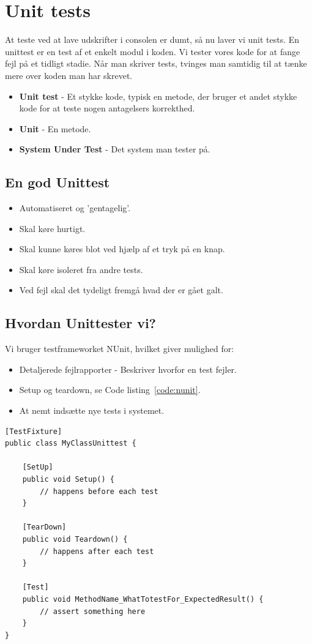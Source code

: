 \section{Unit tests}
At teste ved at lave udskrifter i consolen er dumt, så nu laver vi unit tests. En unittest er en test af et enkelt modul i koden. Vi tester vores kode for at fange fejl på et tidligt stadie. Når man skriver tests, tvinges man samtidig til at tænke mere over koden man har skrevet.

\begin{itemize}
	\item \textbf{Unit test} - Et stykke kode, typisk en metode, der bruger et andet stykke kode for at teste nogen antagelsers korrekthed.
	\item \textbf{Unit} - En metode.
	\item \textbf{System Under Test} - Det system man tester på.
\end{itemize}

\subsection{En god Unittest}
\begin{itemize}
	\item Automatiseret og 'gentagelig'.
	\item Skal køre hurtigt.
	\item Skal kunne køres blot ved hjælp af et tryk på en knap.
	\item Skal køre isoleret fra andre tests.
	\item Ved fejl skal det tydeligt fremgå hvad der er gået galt.
\end{itemize}

\subsection{Hvordan Unittester vi?}

Vi bruger testframeworket NUnit, hvilket giver mulighed for:

\begin{itemize}
	\item Detaljerede fejlrapporter - Beskriver hvorfor en test fejler.
	\item Setup og teardown, se Code listing~\ref{code:nunit}.
	\item At nemt indsætte nye tests i systemet.
\end{itemize}

\begin{lstlisting}[caption=NUnit eksempel på Setup og Teardown.,label=code:nunit]
[TestFixture]
public class MyClassUnittest {

	[SetUp]
	public void Setup() {
		// happens before each test
	}
	
	[TearDown]
	public void Teardown() {
		// happens after each test
	}
	
	[Test]
	public void MethodName_WhatTotestFor_ExpectedResult() {
		// assert something here
	}
}
\end{lstlisting}


